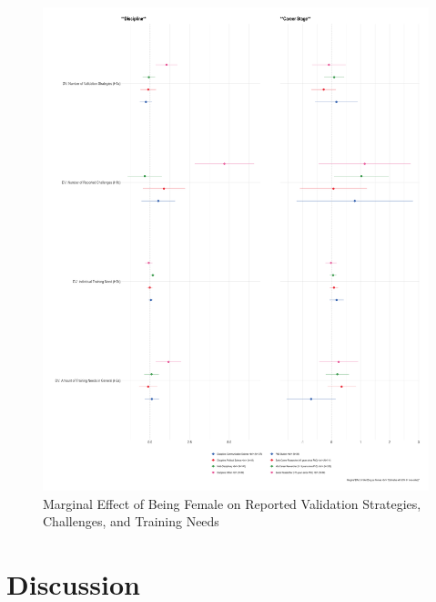 \documentclass[
]{ccr}
\begin{document}
\begin{figure}[H]

{\centering \includegraphics[width=1\textwidth,height=\textheight]{figures/explorative-2.png}

}

\caption{\label{fig:explor}Marginal Effect of Being Female on Reported
Validation Strategies, Challenges, and Training Needs}

\end{figure}

\hypertarget{discussion}{%
\section{Discussion}\label{discussion}}
\end{document}
